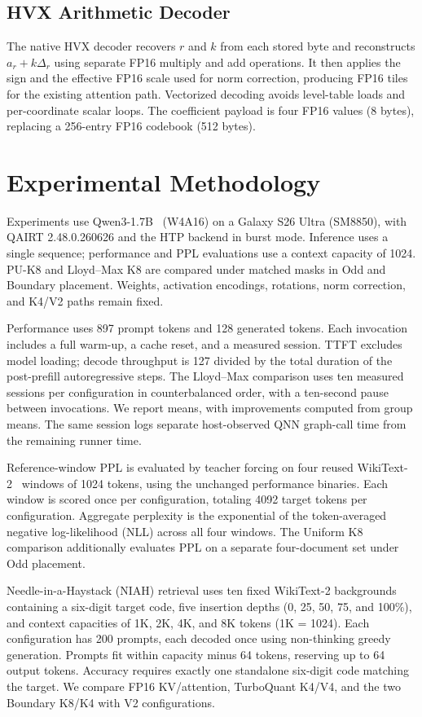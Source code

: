 \documentclass[conference,a4paper,10pt]{IEEEtran}
\begin{document}
\subsection{HVX Arithmetic Decoder}
The native HVX decoder recovers $r$ and $k$ from each stored byte and reconstructs $a_r+k\Delta_r$ using separate FP16 multiply and add operations. It then applies the sign and the effective FP16 scale used for norm correction, producing FP16 tiles for the existing attention path. Vectorized decoding avoids level-table loads and per-coordinate scalar loops. The coefficient payload is four FP16 values (8 bytes), replacing a 256-entry FP16 codebook (512 bytes).

\section{Experimental Methodology}
Experiments use Qwen3-1.7B~\cite{qwen3} (W4A16) on a Galaxy S26 Ultra (SM8850), with QAIRT 2.48.0.260626 and the HTP backend in burst mode. Inference uses a single sequence; performance and PPL evaluations use a context capacity of 1024. PU-K8 and Lloyd--Max K8 are compared under matched masks in Odd and Boundary placement. Weights, activation encodings, rotations, norm correction, and K4/V2 paths remain fixed.

Performance uses 897 prompt tokens and 128 generated tokens. Each invocation includes a full warm-up, a cache reset, and a measured session. TTFT excludes model loading; decode throughput is 127 divided by the total duration of the post-prefill autoregressive steps. The Lloyd--Max comparison uses ten measured sessions per configuration in counterbalanced order, with a ten-second pause between invocations. We report means, with improvements computed from group means. The same session logs separate host-observed QNN graph-call time from the remaining runner time.

Reference-window PPL is evaluated by teacher forcing on four reused WikiText-2~\cite{wikitext} windows of 1024 tokens, using the unchanged performance binaries. Each window is scored once per configuration, totaling 4092 target tokens per configuration. Aggregate perplexity is the exponential of the token-averaged negative log-likelihood (NLL) across all four windows. The Uniform K8 comparison additionally evaluates PPL on a separate four-document set under Odd placement.

Needle-in-a-Haystack (NIAH) retrieval uses ten fixed WikiText-2 backgrounds containing a six-digit target code, five insertion depths (0, 25, 50, 75, and 100\%), and context capacities of 1K, 2K, 4K, and 8K tokens (1K = 1024). Each configuration has 200 prompts, each decoded once using non-thinking greedy generation. Prompts fit within capacity minus 64 tokens, reserving up to 64 output tokens. Accuracy requires exactly one standalone six-digit code matching the target. We compare FP16 KV/attention, TurboQuant K4/V4, and the two Boundary K8/K4 with V2 configurations.
\end{document}
